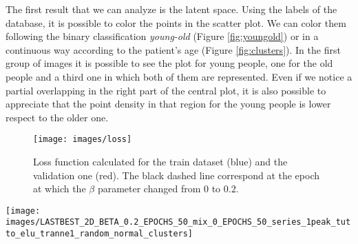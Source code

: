 \documentclass[12pt,a4paper,twocolumn]{article}
\begin{document}
			The first result that we can analyze is the latent space. Using the labels of the database, it is possible to color the points in the scatter plot. We can color them following the binary classification \emph{young-old} (Figure \ref{fig:youngold}) or in a continuous way according to the patient's age (Figure \ref{fig:clusters}). In the first group of images it is possible to see the plot for young people, one for the old people and a third one in which both of them are represented. Even if we notice a partial overlapping in the right part of the central plot, it is also possible to appreciate that the point density in that region for the young people is lower respect to the older one. 
			
			\begin{figure}[H]
				\centering
				\texttt{[image: images/loss]}
				\caption{Loss function calculated for the train dataset (blue) and the validation one (red). The black dashed line correspond at the epoch at which the $\beta$ parameter changed from 0 to $0.2$.}
				\label{fig:loss}
			\end{figure}
		
			\begin{figure*}[ht]
				\centering
				\texttt{[image: images/LASTBEST\_2D\_BETA\_0.2\_EPOCHS\_50\_mix\_0\_EPOCHS\_50\_series\_1peak\_tutto\_elu\_tranne1\_random\_normal\_clusters]}
				\caption{Latent space with the points colored according to the age of the people.}
				\label{fig:clusters}
			\end{figure*}
			
\end{document}

